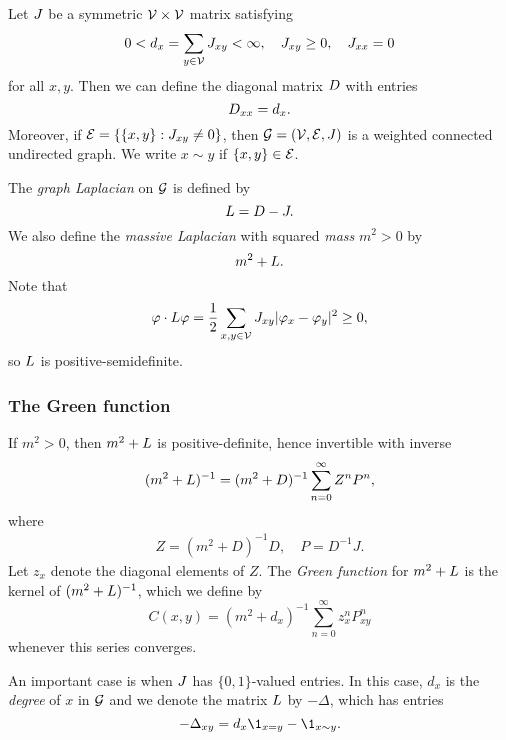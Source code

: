 Let $J$ be a symmetric $\mathcal{V}\times\mathcal{V}$ matrix satisfying
\begin{equation}
0 < d_x = \sum_{y\in\mathcal{V}} J_{xy} < \infty,
  \quad
J_{xy} \ge 0,
  \quad
J_{xx} = 0
\end{equation}
for all $x, y$. Then we can define the diagonal matrix $D$ with entries
\begin{equation}
D_{xx} = d_x.
\end{equation}
Moreover, if $\mathcal{E} = \{ \{ x, y \} : J_{xy} \ne 0 \}$, then
$\mathcal{G} = (\mathcal{V}, \mathcal{E}, J)$ is a weighted connected undirected graph.
We write $x \sim y$ if $\{ x, y \} \in \mathcal{E}$.

The \emph{graph Laplacian} on $\mathcal{G}$ is defined by
\begin{equation}
L = D - J.
\end{equation}
We also define the \emph{massive Laplacian} with squared \emph{mass} $m^2 > 0$
by
\begin{equation}
m^2 + L.
\end{equation}
Note that
\begin{equation}
\varphi \cdot L \varphi
  =
\frac{1}{2} \sum_{x,y\in\mathcal{V}} J_{xy} |\varphi_x - \varphi_y|^2
  \ge
0,
\end{equation}
so $L$ is positive-semidefinite.

\subsubsection{The Green function}

If $m^2 > 0$, then $m^2 + L$ is positive-definite, hence invertible with inverse
\begin{equation}
(m^2 + L)^{-1} = (m^2 + D)^{-1} \sum_{n=0}^\infty Z^n P^n,
\end{equation}
where
\begin{align}
Z = (m^2 + D)^{-1} D,
  \quad
P = D^{-1} J.
\end{align}
Let $z_x$ denote the diagonal elements of $Z$.
The \emph{Green function} for $m^2 + L$ is the kernel of $(m^2 + L)^{-1}$, which we define by
\begin{equation}
C(x, y)
  =
(m^2 + d_x)^{-1} \sum_{n=0}^\infty z_x^n P^n_{xy}
\end{equation}
whenever this series converges.

\begin{example}
An important case is when $J$ has $\{0, 1 \}$-valued entries. In this case, $d_x$ is the
\emph{degree} of $x$ in $\mathcal{G}$ and we denote the matrix $L$ by $-\Delta$, which has
entries
\begin{equation}
-\Delta_{xy} = d_x \1_{x=y} - \1_{x \sim y}.
\end{equation}
\end{example}

